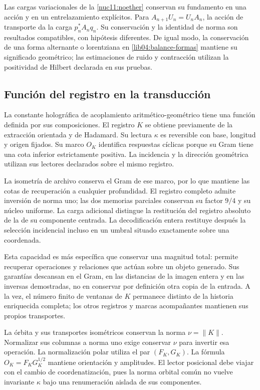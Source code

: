 Las cargas variacionales de la \cref{nuc11:noether} conservan su
fundamento en una acción y en un entrelazamiento explícitos. Para
\(A_{n+1}U_n=U_nA_n\), la acción de transporte da la carga
\(p_n^*A_nq_n\). Su conservación y la identidad de norma son
resultados compatibles, con hipótesis diferentes. De igual modo,
la conservación de una forma alternante o lorentziana en
\eqref{lib04:balance-formas} mantiene su significado geométrico;
las estimaciones de ruido y contracción utilizan la positividad
de Hilbert declarada en sus pruebas.

\subsection{Función del registro en la transducción}
\label{lib06:registro}

La constante holográfica de acoplamiento aritmético-geométrico tiene
una función definida por sus composiciones. El registro \(K\)
se obtiene previamente de la extracción orientada y de Hadamard.
Su lectura \(\kappa\) es reversible con base, longitud y origen
fijados. Su marco \(O_K\) identifica respuestas cíclicas porque
su Gram tiene una cota inferior estrictamente positiva. La
incidencia y la dirección geométrica utilizan sus lectores
declarados sobre el mismo registro.

La isometría de archivo conserva el Gram de ese marco, por lo que
mantiene las cotas de recuperación a cualquier profundidad. El
registro completo admite inversión de norma uno; las dos memorias
parciales conservan su factor \(9/4\) y su núcleo uniforme. La
carga adicional distingue la restitución del registro absoluto de
la de su componente centrada. La decodificación entera restituye
después la selección incidencial incluso en un umbral situado
exactamente sobre una coordenada.

Esta capacidad es más específica que conservar una magnitud total:
permite recuperar operaciones y relaciones que actúan sobre un
objeto generado. Sus garantías descansan en el Gram, en las
distancias de la imagen entera y en las inversas demostradas, no
en conservar por definición otra copia de la entrada. A la vez,
el número finito de ventanas de \(K\) permanece distinto de la
historia enriquecida completa; los otros registros y marcas
acompañantes mantienen sus propios transportes.

La órbita y sus transportes isométricos conservan la norma
\(\nu=\|K\|\). Normalizar sus columnas a norma uno exige
conservar \(\nu\) para invertir esa operación. La normalización
polar utiliza el par
\((F_K,G_K)\). La fórmula
\(O_K=F_KG_K^{1/2}\) mantiene orientación y amplitudes.
El lector posicional debe viajar con el cambio de coordenatización, pues la
norma orbital común no vuelve invariante \(\kappa\) bajo una
renumeración aislada de sus componentes.

